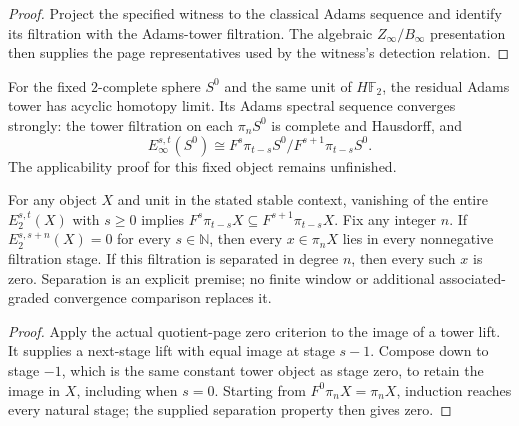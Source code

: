 \begin{proof}
  Project the specified witness to the classical Adams sequence and identify
  its filtration with the Adams-tower filtration.  The algebraic
  $Z_\infty/B_\infty$ presentation then supplies the page representatives used
  by the witness's detection relation.
\end{proof}

\begin{proposition}
  \label{prop:fixed-sphere-adams-applicability}
  \notready
  For the fixed $2$-complete sphere $S^0$ and the same unit of
  $H\mathbb F_2$, the residual Adams tower has acyclic homotopy limit.
  Its Adams spectral sequence converges strongly: the tower filtration
  on each $\pi_nS^0$ is complete and Hausdorff, and
  \[
    E_\infty^{s,t}(S^0)\cong
    F^s\pi_{t-s}S^0/F^{s+1}\pi_{t-s}S^0.
  \]
  The applicability proof for this fixed object remains unfinished.
\end{proposition}

\begin{lemma}
  \label{lem:adams-e2-vanishing-separated}
  \leanok
  For any object $X$ and unit in the stated stable context, vanishing of
  the entire $E_2^{s,t}(X)$ with $s\ge0$ implies
  $F^s\pi_{t-s}X\subseteq F^{s+1}\pi_{t-s}X$.
  Fix any integer $n$. If $E_2^{s,s+n}(X)=0$ for every $s\in\mathbb N$,
  then every $x\in\pi_nX$ lies in every nonnegative filtration stage.
  If this filtration is separated in degree $n$, then every such $x$ is zero.
  Separation is an explicit premise; no finite window or additional
  associated-graded convergence comparison replaces it.
\end{lemma}
\begin{proof}
  \leanok
  Apply the actual quotient-page zero criterion to the image of a tower
  lift. It supplies a next-stage lift with equal image at stage $s-1$.
  Compose down to stage $-1$, which is the same constant tower object
  as stage zero, to retain the image in $X$, including when $s=0$.
  Starting from $F^0\pi_nX=\pi_nX$, induction reaches every natural stage;
  the supplied separation property then gives zero.
\end{proof}

